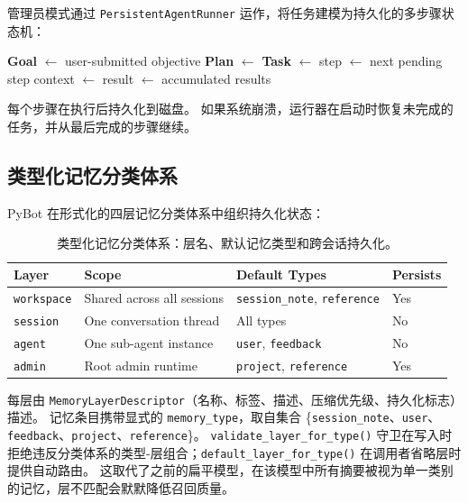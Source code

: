 \documentclass[11pt,a4paper]{article}
\begin{document}
管理员模式通过 \texttt{PersistentAgentRunner} 运作，将任务建模为持久化的多步骤状态机：

\begin{algorithm}[h]
\caption{管理员任务生命周期}
\begin{algorithmic}[1]
\State \textbf{Goal} $\gets$ user-submitted objective
\State \textbf{Plan} $\gets$ 
\State \textbf{Task} $\gets$ 
  \State step $\gets$ next pending step
  \State context $\gets$ 
  \State result $\gets$ 
  \State {}
    \State {}
  \EndIf
\EndWhile
\State \Return accumulated results
\end{algorithmic}
\end{algorithm}

每个步骤在执行后持久化到磁盘。
如果系统崩溃，运行器在启动时恢复未完成的任务，并从最后完成的步骤继续。

\subsection{类型化记忆分类体系}
\label{sec:memory-taxonomy}

PyBot 在形式化的四层记忆分类体系中组织持久化状态：

\begin{table}[h]
\centering
\small
\begin{tabularx}{\textwidth}{llXl}
\toprule
\textbf{Layer} & \textbf{Scope} & \textbf{Default Types} & \textbf{Persists} \\
\midrule
\texttt{workspace} & Shared across all sessions & \texttt{session\_note}, \texttt{reference} & Yes \\
\texttt{session} & One conversation thread & All types & No \\
\texttt{agent} & One sub-agent instance & \texttt{user}, \texttt{feedback} & No \\
\texttt{admin} & Root admin runtime & \texttt{project}, \texttt{reference} & Yes \\
\bottomrule
\end{tabularx}
\caption{类型化记忆分类体系：层名、默认记忆类型和跨会话持久化。}
\label{tab:memory-taxonomy}
\end{table}

每层由 \texttt{MemoryLayerDescriptor}（名称、标签、描述、压缩优先级、持久化标志）描述。
记忆条目携带显式的 \texttt{memory\_type}，取自集合 \{\texttt{session\_note}、\texttt{user}、\texttt{feedback}、\texttt{project}、\texttt{reference}\}。
\texttt{validate\_layer\_for\_type()} 守卫在写入时拒绝违反分类体系的类型-层组合；\texttt{default\_layer\_for\_type()} 在调用者省略层时提供自动路由。
这取代了之前的扁平模型，在该模型中所有摘要被视为单一类别的记忆，层不匹配会默默降低召回质量。
\end{document}
